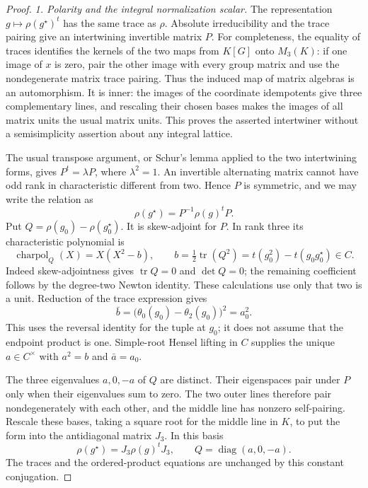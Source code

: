 \begin{proof}
\emph{1. Polarity and the integral normalization scalar.}
The representation \(g\mapsto\rho(g^\star)^t\) has the
same trace as \(\rho\).
Absolute irreducibility and the trace pairing give an
intertwining invertible matrix \(P\).
For completeness, the equality of traces identifies the
kernels of the two maps from \(K[G]\) onto \(M_3(K)\):
if one image of \(x\) is zero, pair the other image with
every group matrix and use the nondegenerate matrix trace
pairing.  Thus the induced map of matrix algebras is an
automorphism.  It is inner: the images of the coordinate
idempotents give three complementary lines, and rescaling
their chosen bases makes the images of all matrix units
the usual matrix units.  This proves the asserted
intertwiner without a semisimplicity assertion about any
integral lattice.

The usual transpose argument, or Schur's lemma applied to
the two intertwining forms, gives \(P^t=\lambda P\),
where \(\lambda^2=1\).
An invertible alternating matrix cannot have odd rank in
characteristic different from two.  Hence \(P\) is symmetric,
and we may write the relation as
\[
       \rho(g^\star)=P^{-1}\rho(g)^tP.
 \tag{G107.9}
\]
Put \(Q=\rho(g_0)-\rho(g_0^\star)\).
It is skew-adjoint for \(P\).
In rank three its characteristic polynomial is
\[
 \operatorname{charpol}_Q(X)=X(X^2-b),\qquad
 b=\tfrac12\operatorname{tr}(Q^2)
   =t(g_0^2)-t(g_0g_0^\star)\in C.
 \tag{G107.10}
\]
Indeed skew-adjointness gives \(\operatorname{tr}Q=0\)
and \(\det Q=0\); the remaining coefficient follows by
the degree-two Newton identity.  These calculations
use only that two is a unit.
Reduction of the trace expression gives
\[
             \bar b=
        \bigl(\theta_0(g_0)-\theta_2(g_0)\bigr)^2=a_0^2.
 \tag{G107.11}
\]
This uses the reversal identity for the tuple at \(g_0\);
it does not assume that the endpoint product is one.
Simple-root Hensel lifting in \(C\) supplies the unique
\(a\in C^\times\) with \(a^2=b\) and \(\bar a=a_0\).

The three eigenvalues \(a,0,-a\) of \(Q\) are distinct.
Their eigenspaces pair under \(P\) only when their
eigenvalues sum to zero.  The two outer lines therefore
pair nondegenerately with each other, and the middle
line has nonzero self-pairing.
Rescale these bases, taking a square root for the middle
line in \(K\), to put the form into the antidiagonal
matrix \(J_3\).
In this basis
\[
 \rho(g^\star)=J_3\rho(g)^tJ_3,\qquad
 Q=\operatorname{diag}(a,0,-a).
 \tag{G107.12}
\]
The traces and the ordered-product equations are
unchanged by this constant conjugation.


\end{proof}
